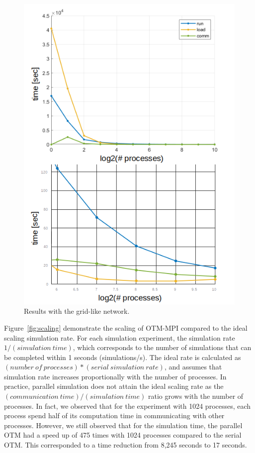 \begin{figure}[!ht]
    \centering
    \includegraphics[width=\columnwidth]{figs/synthetic_results.png}
    \caption{Results with the grid-like network.}
    \label{fig:mpirun}
\end{figure}

Figure~\ref{fig:scaling} demonstrate the scaling of OTM-MPI compared to the ideal scaling simulation rate. For each simulation experiment, the simulation rate $1/(simulation \:time)$, which corresponds to the number of simulations that can be completed within 1 seconds (simulations/s). The ideal rate is calculated as $(number\: of\: processes)*(serial\: simulation\: rate)$, and assumes that simulation rate increases proportionally with the number of processes. In practice, parallel simulation does not attain the ideal scaling rate as the $(communication\:time)/(simulation\:time)$ ratio grows with the number of processes. In fact, we observed that for the experiment with 1024 processes, each process spend half of its computation time in communicating with other processes. However, we still observed that for the simulation time, the parallel OTM had a speed up of 475 times with 1024 processes compared to the serial OTM. This corresponded to a time reduction from 8,245 seconds to 17 seconds.

